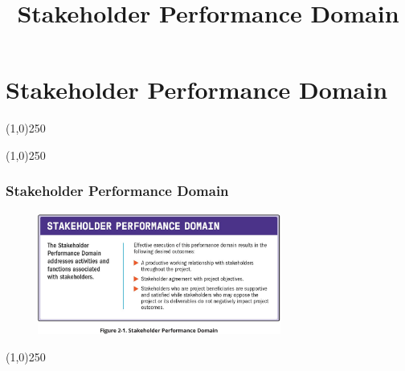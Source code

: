 



%
\title[Project Management \& BIM]{Stakeholder Performance Domain}



%
\usetikzlibrary{arrows}



\newpage




\thispagestyle{empty}
\tableofcontents
\newpage
\section{Stakeholder Performance Domain}


\begin{frame}
\titlepage
\end{frame}\begin{center}\line(1,0){250}\end{center}
%
%
\begin{center}\line(1,0){250}\end{center}




\begin{frame}
\frametitle{Stakeholder Performance Domain}
 \begin{figure}
    \centering
        \includegraphics[width = 8cm]{../images/guide/Fig2-1.jpg}
    \label{guidefig:2-1}
 \end{figure}
\end{frame}
\begin{center}\line(1,0){250}\end{center}


